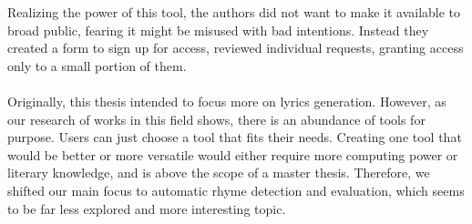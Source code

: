 Realizing the power of this tool, the authors did not want to make it available to broad public, fearing it might be misused with bad intentions. Instead they created a form to sign up for access, reviewed individual requests, granting access only to a small portion of them.



\paragraph{}Originally, this thesis intended to focus more on lyrics generation. However, as our research of works in this field shows, there is an abundance of tools for purpose. Users can just choose a tool that fits their needs. Creating one tool that would be better or more versatile would either require more computing power or literary knowledge, and is above the scope of a master thesis. Therefore, we shifted our main focus to automatic rhyme detection and evaluation, which seems to be far less explored and more interesting topic.



